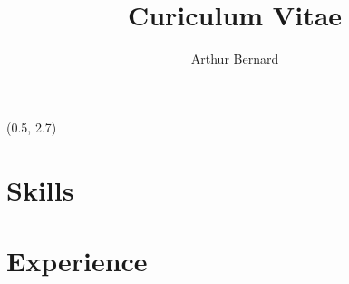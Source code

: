 \documentclass[a4paper,11pt]{arthur-cv}
\title{Curiculum Vitae}
\author{Arthur Bernard}
\begin{document}
\makeprofile %

\begin{textblock}{17}(0.5, 2.7)

  \begin{minipage}[t]{0.33\textwidth}
  
    \section{Skills}

    \hfill

  \end{minipage}

  \hfill

  \begin{minipage}[t]{0.66\textwidth}
  
    \section{Experience}

  \end{minipage}

\end{textblock}
\end{document}
